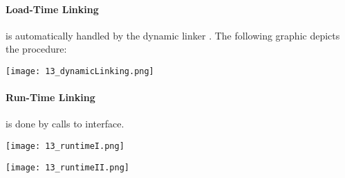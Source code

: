 \paragraph{Load-Time Linking} is automatically handled by the dynamic linker . The following graphic depicts the procedure:

\texttt{[image: 13\_dynamicLinking.png]}

\paragraph{Run-Time Linking} is done by calls to  interface.

\texttt{[image: 13\_runtimeI.png]}

\texttt{[image: 13\_runtimeII.png]}

